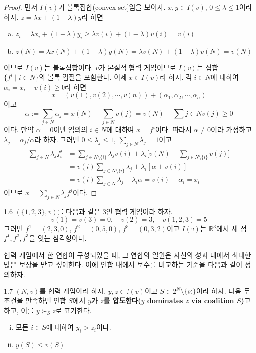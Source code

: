 \documentclass{article}
\numberwithin{equation}{section}
\begin{document}
\begin{proof}
	먼저 $I(v)$가 볼록집합(convex set)임을 보이자. $x,y\in I(v)$, $0\leq\lambda\leq1$이라 하자. $z=\lambda x+(1-\lambda)y$라 하면
	\begin{enumerate}[(a)]
		\item $z_i=\lambda x_i+(1-\lambda)y_i\geq\lambda v(i)+(1-\lambda)v(i)=v(i)$
		\item $z(N)=\lambda x(N)+(1-\lambda)y(N)=\lambda v(N)+(1-\lambda)v(N)=v(N)$
	\end{enumerate}
	이므로 $I(v)$는 볼록집합이다. $v$가 본질적 협력 게임이므로 $I(v)$는 집합 $\{f^i\mid i\in N\}$의 볼록 껍질을 포함한다. 이제 $x\in I(v)$라 하자. 각 $i\in N$에 대하여 $\alpha_i=x_i-v(i)\geq0$라 하면
	\[
		x=(v(1),v(2),\cdots,v(n))+(\alpha_1,\alpha_2,\cdots,\alpha_n)
	\]
	이고
	\[
		\alpha:=\sum_{j\in N}\alpha_j=x(N)-\sum_{j\in N}v(j)=v(N)-\sum{j\in N}v(j)\geq0
	\]
	이다. 만약 $\alpha=0$이면 임의의 $i\in N$에 대하여 $x=f^i$이다. 따라서 $\alpha\ne0$이라 가정하고 $\lambda_j=\alpha_j/\alpha$라 하자. 그러면 $0\leq\lambda_j\leq1$, $\sum_{j\in N}\lambda_j=1$이고
	\[
		\begin{aligned}
			\sum_{j\in N}\lambda_jf^j_i&=\sum_{j\in N\setminus\{i\}}\lambda_jv(i)+\lambda_i\biggl[v(N)-\sum_{j\in N\setminus\{i\}}v(j)\biggr]\\[3pt]
			&=v(i)\sum_{j\in N\setminus\{i\}}\lambda_j+\lambda_i[\alpha+v(i)]\\[3pt]
			&=v(i)\sum_{j\in N}\lambda_j+\lambda_i\alpha=v(i)+\alpha_i=x_i
		\end{aligned}
	\]
	이므로 $x=\sum_{j\in N}\lambda_jf^j$이다.
\end{proof}

\begin{example}{}{1.6}
  $(\{1,2,3\},v)$를 다음과 같은 $3$인 협력 게임이라 하자.
  \[
  	v(1)=v(3)=0,\quad v(2)=3,\quad v(1,2,3)=5
  \]
  그러면 $f^1=(2,3,0)$, $f^2=(0,5,0)$, $f^3=(0,3,2)$이고 $I(v)$는 $\mathbb R^3$에서 세 점 $f^1,f^2,f^3$을 잇는 삼각형이다.
\end{example}

협력 게임에서 한 연합이 구성되었을 때, 그 연합의 일원은 자신의 성과 내에서 최대한 많은 보상을 받고 싶어한다. 이에 연합 내에서 보수를 비교하는 기준을 다음과 같이 정의하자.

\begin{dfn}{}{1.7}
	$(N,v)$를 협력 게임이라 하자. $y,z\in I(v)$이고 $S\in 2^N\setminus\{\varnothing\}$이라 하자. 다음 두 조건을 만족하면 연합 $S$에서 \textbf{$y$가 $z$를 압도한다($y$ dominates $z$ via coalition $S$)}고 하고, 이를 $y\succ_Sz$로 표기한다.
	\begin{enumerate}[(i)]
		\item 모든 $i\in S$에 대하여 $y_i>z_i$이다.
		\item $y(S)\leq v(S)$
	\end{enumerate}
\end{dfn}
\end{document}
